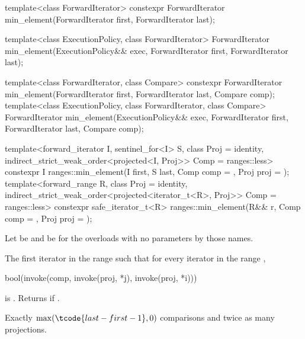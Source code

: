 %
\begin{itemdecl}
template<class ForwardIterator>
  constexpr ForwardIterator min_element(ForwardIterator first, ForwardIterator last);

template<class ExecutionPolicy, class ForwardIterator>
  ForwardIterator min_element(ExecutionPolicy&& exec,
                              ForwardIterator first, ForwardIterator last);

template<class ForwardIterator, class Compare>
  constexpr ForwardIterator min_element(ForwardIterator first, ForwardIterator last,
                                        Compare comp);
template<class ExecutionPolicy, class ForwardIterator, class Compare>
  ForwardIterator min_element(ExecutionPolicy&& exec,
                              ForwardIterator first, ForwardIterator last,
                              Compare comp);

template<forward_iterator I, sentinel_for<I> S, class Proj = identity,
         indirect_strict_weak_order<projected<I, Proj>> Comp = ranges::less>
  constexpr I ranges::min_element(I first, S last, Comp comp = {}, Proj proj = {});
template<forward_range R, class Proj = identity,
         indirect_strict_weak_order<projected<iterator_t<R>, Proj>> Comp = ranges::less>
  constexpr safe_iterator_t<R>
    ranges::min_element(R&& r, Comp comp = {}, Proj proj = {});
\end{itemdecl}

\begin{itemdescr}
\pnum
Let  be 
and  be 
for the overloads with no parameters by those names.

\pnum
\returns
The first iterator  in the range 
such that for every iterator  in the range ,
\begin{codeblock}
bool(invoke(comp, invoke(proj, *j), invoke(proj, *i)))
\end{codeblock}
is .
Returns  if .

\pnum
\complexity
Exactly $\max(\tcode{last - first - 1}, 0)$ comparisons and
twice as many projections.
\end{itemdescr}

